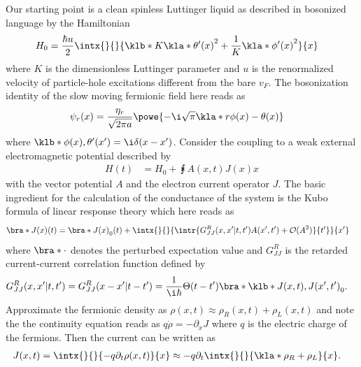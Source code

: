 \documentclass[english, parskip=full]{scrartcl}
\title{\titel}
\date{\today}
\begin{document}
\maketitle  %


Our starting point is a clean spinless Luttinger liquid as described in bosonized language by the Hamiltonian
\begin{align}
H_0 &= \frac{\hbar u}{2} \intx{ }{ }{\klb*{K\kla*{\theta'(x)}^2 + \frac{1}{K} \kla*{\phi'(x)}^2}}{x}
\end{align}
where $K$ is the dimensionless Luttinger parameter and $u$ is the renormalized velocity of particle-hole excitations different from the bare $v_F$.
The bosonization identity of the slow moving fermionic field here reads as 
\begin{align}
\psi_r(x) &= \frac{\eta_r}{\sqrt{2\pi a}} \powe{-\i \sqrt{\pi} \kla*{r\phi(x) - \theta(x)}}
\end{align}
where $\klb*{\phi(x), \theta'(x')} = \i\delta(x-x')$. 
Consider the coupling to a weak external electromagnetic potential described by
\begin{align}
H(t) &= H_0 + \intx{ }{ }{A(x,t)J(x)}{x}
\end{align}
with the vector potential $A$ and the electron current operator $J$.
The basic ingredient for the calculation of the conductance of the system is the Kubo formula of linear response theory which here reads as
\begin{align}
\bra*{J(x)}(t) &= \bra*{J(x)}_0(t) + \intx{ }{ }{\intr{G_{JJ}^R(x,x'|t,t') A(x',t') + \mathcal{O}(A^2)}{t'}}{x'}
\end{align}
where $\bra*{\cdot}$ denotes the perturbed expectation value and $G_{JJ}^R$ is the retarded current-current correlation function defined by
\begin{align}
G_{JJ}^R(x,x'|t,t') &= G_{JJ}^R(x-x'|t-t') = \frac{1}{\i\hbar} \Theta(t-t') \bra*{\klb*{J(x,t), J(x',t')} }_0.
\end{align}
Approximate the fermionic density as $\rho(x,t) \approx\rho_R(x,t) + \rho_L(x,t)$ and note the the continuity equation reads as $q\dot{\rho} = - \partial_xJ$ where $q$ is the electric charge of the fermions.
Then the current can be written as
\begin{align}
J(x,t) &= \intx{ }{ }{-q\partial_t \rho(x,t)}{x} \approx -q\partial_t \intx{ }{ }{\kla*{\rho_R + \rho_L}}{x}.
\end{align}
\end{document}
